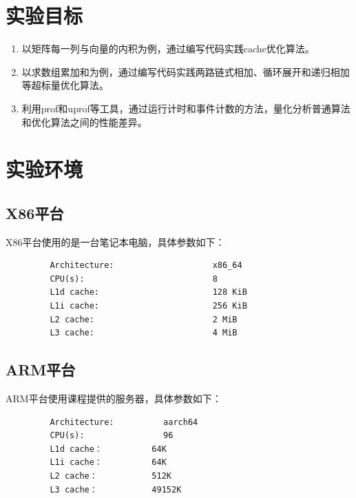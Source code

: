 \documentclass[a4paper]{article}
\begin{document}
\section{实验目标}
    \begin{enumerate}
      \item 以矩阵每一列与向量的内积为例，通过编写代码实践cache优化算法。
      \item 以求数组累加和为例，通过编写代码实践两路链式相加、循环展开和递归相加等超标量优化算法。
      \item 利用prof和uprof等工具，通过运行计时和事件计数的方法，量化分析普通算法和优化算法之间的性能差异。
    \end{enumerate}
\section{实验环境}
   \subsection{X86平台}
      X86平台使用的是一台笔记本电脑，具体参数如下：
      \begin{verbatim}
         Architecture:                    x86_64
         CPU(s):                          8
         L1d cache:                       128 KiB
         L1i cache:                       256 KiB
         L2 cache:                        2 MiB
         L3 cache:                        4 MiB
      \end{verbatim}
  \subsection{ARM平台}
  ARM平台使用课程提供的服务器，具体参数如下：
      \begin{verbatim}
         Architecture:          aarch64
         CPU(s):                96
         L1d cache：          64K
         L1i cache：          64K
         L2 cache：           512K
         L3 cache：           49152K
      \end{verbatim}
\end{document}
